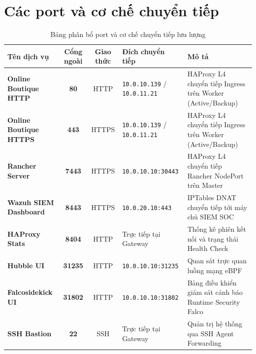 \section{Các port và cơ chế chuyển tiếp}
\begin{table}[H]
    \centering
    \small
    \renewcommand{\arraystretch}{1.25}
    \caption{Bảng phân bổ port và cơ chế chuyển tiếp lưu lượng}
    \label{tab:port_mapping}
    \begin{tabularx}{\textwidth}{l c c l X}
        \toprule
        \textbf{Tên dịch vụ} & \textbf{Cổng ngoài} & \textbf{Giao thức} & \textbf{Đích chuyển tiếp} & \textbf{Mô tả} \\
        \midrule
        \textbf{Online Boutique HTTP} & \textbf{80} & HTTP & \texttt{10.0.10.139} / \texttt{10.0.11.21} & HAProxy L4 chuyển tiếp Ingress trên Worker (Active/Backup) \\
        \textbf{Online Boutique HTTPS} & \textbf{443} & HTTPS & \texttt{10.0.10.139} / \texttt{10.0.11.21} & HAProxy L4 chuyển tiếp Ingress trên Worker (Active/Backup) \\
        \textbf{Rancher Server} & \textbf{7443} & HTTPS & \texttt{10.0.10.10:30443} & HAProxy L4 chuyển tiếp Rancher NodePort trên Master \\
        \textbf{Wazuh SIEM Dashboard} & \textbf{8443} & HTTPS & \texttt{10.0.20.10:443} & IPTables DNAT chuyển tiếp tới máy chủ SIEM SOC \\
        \textbf{HAProxy Stats} & \textbf{8404} & HTTP & Trực tiếp tại Gateway & Thống kê phiên kết nối và trạng thái Health Check \\
        \textbf{Hubble UI} & \textbf{31235} & HTTP & \texttt{10.0.10.10:31235} & Quan sát trực quan luồng mạng eBPF \\
        \textbf{Falcosidekick UI} & \textbf{31802} & HTTP & \texttt{10.0.10.10:31802} & Bảng điều khiển giám sát cảnh báo Runtime Security Falco \\
        \textbf{SSH Bastion} & \textbf{22} & SSH & Trực tiếp tại Gateway & Quản trị hệ thống qua SSH Agent Forwarding \\
        \bottomrule
    \end{tabularx}
\end{table}

